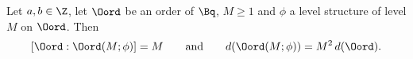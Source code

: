 Let $a,b\in\Z$, let $\Oord$ be an order of $\Bq$, $M\ge1$ and $\phi$ a level structure of level $M$ on $\Oord$. Then
\[
  [\Oord:\Oord(M;\phi)]=M\qquad\text{and}\qquad d(\Oord(M;\phi))=M^2\,d(\Oord).
\]
